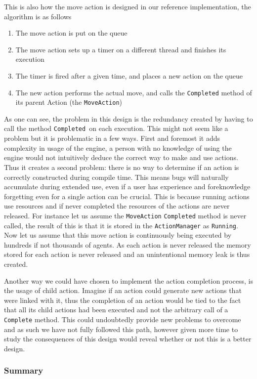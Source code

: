 This is also how the move action is designed in our reference implementation,
the algorithm is as follows
\begin{enumerate}
\item The move action is put on the queue 
\item The move action sets up a timer on a different thread and finishes
its execution
\item The timer is fired after a given time, and places a new action on
the queue
\item The new action performs the actual move, and calls the \texttt{Completed}
method of its parent Action (the \texttt{MoveAction})
\end{enumerate}
As one can see, the problem in this design is the redundancy created
by having to call the method \texttt{Completed }on each execution.
This might not seem like a problem but it is problematic in a few
ways. First and foremost it adds complexity in usage of the engine,
a person with no knowledge of using the engine would not intuitively
deduce the correct way to make and use actions. Thus it creates a
second problem: there is no way to determine if an action is correctly
constructed during compile time. This means bugs will naturally accumulate
during extended use, even if a user has experience and foreknowledge
forgetting even for a single action can be crucial. This is because
running actions use resources and if never completed the resources
of the actions are never released. For instance let us assume the
\texttt{MoveAction} \texttt{Completed} method is never called, the
result of this is that it is stored in the \texttt{ActionManager}
as \texttt{Running}. Now let us assume that this move action is continuously
being executed by hundreds if not thousands of agents. As each action
is never released the memory stored for each action is never released
and an unintentional memory leak is thus created.

Another way we could have chosen to implement the action completion
process, is the usage of child action. Imagine if an action could
generate new actions that were linked with it, thus the completion
of an action would be tied to the fact that all its child actions
had been executed and not the arbitrary call of a \texttt{Complete}
method. This could undoubtedly provide new problems to overcome and
as such we have not fully followed this path, however given more time
to study the consequences of this design would reveal whether or not
this is a better design. 


\subsubsection*{Summary}


